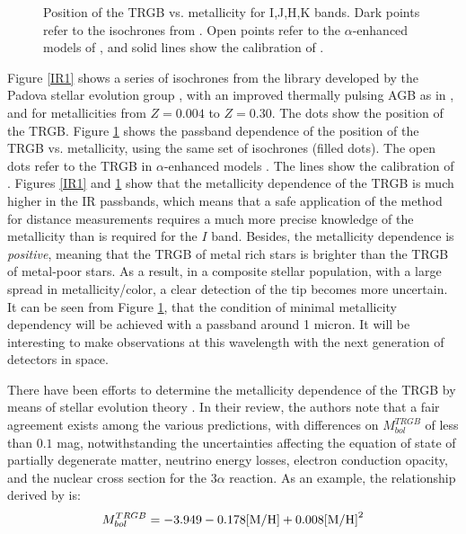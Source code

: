 \documentclass[11pt,preprint2]{aastex}
\begin{document}
\begin{figure}
\caption{Position of the TRGB vs. metallicity for I,J,H,K bands. Dark points refer to the isochrones from \citet{2002AA...391..195G}. Open points refer to the $\alpha$-enhanced models of \citet{2000AA...361.1023S}, and solid lines show the calibration of \citet{2004AA...424..199B}.}
\label{IR2}
\end{figure}
Figure \ref{IR1} shows a series of isochrones from the library developed by the Padova stellar evolution group \citep{2002AA...391..195G}, with an improved thermally pulsing AGB as in \citet{2006AA...452..195C}, and for metallicities from $Z=0.004$ to $Z=0.30$. The dots show the position of the TRGB. 
Figure \ref{IR2} shows the passband dependence of the position of the TRGB vs. metallicity, using the same set of isochrones (filled dots). The open dots refer to the TRGB in $\alpha$-enhanced models 
\citep{2000AA...361.1023S}. The lines show the calibration of \citet{2004AA...424..199B}.
Figures \ref{IR1} and \ref{IR2} show that the metallicity dependence of the TRGB  is much higher in the IR passbands, which means that a safe application of the method for distance measurements requires a much more precise knowledge of the metallicity than is required for the $I$ band. Besides, the metallicity dependence is {\it positive}, meaning that the TRGB of metal rich stars is brighter than the TRGB of metal-poor stars. As a result, in a composite stellar population, with a large spread in metallicity/color, a clear detection of the tip becomes  more uncertain. It can be seen from Figure \ref{IR2}, that the condition of minimal metallicity dependency will be achieved with a passband around 1 micron. It will be interesting to make observations at this wavelength with the next generation of detectors in space.

There have been efforts to determine the metallicity dependence of the TRGB by means of stellar evolution theory \citep[see][for a review of work on the subject]{2002PASP..114..375S}.
In their review, the authors note that a fair agreement exists among the various predictions, with differences on $M_{bol}^{TRGB}$ of less than $0.1$ mag, notwithstanding the uncertainties affecting the equation of state of partially degenerate matter, neutrino energy losses, electron conduction opacity, and the nuclear cross section for the $3\alpha$ reaction. As an example, the relationship derived by
\citet{1998MNRAS.298..166S} is:
$$ M_{bol}^{TRGB} = -3.949 -0.178 \rm{[M/H]} +0.008 \rm{[M/H]}^2 $$
\end{document}
